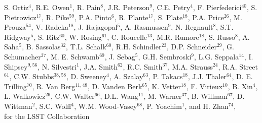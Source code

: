 {S. Ortiz$^4$,
R.E. Owen$^1$,
R. Pain$^{8}$,
J.R. Peterson$^{9}$,
C.E. Petry$^{4}$,
F. Pierfederici$^{40}$,
S. Pietrowicz$^{17}$,
R. Pike$^{59}$,
P.A. Pinto$^{6}$,
R. Plante$^{17}$,
S. Plate$^{18}$,
P.A. Price$^{26}$,
M. Prouza$^{54}$,
V. Radeka$^{18}$,
J. Rajagopal$^5$,
A. Rasmussen$^9$,
N. Regnault$^8$,
S.T. Ridgway$^5$,
S. Ritz$^{60}$,
W. Rosing$^{61}$,
C. Roucelle$^{13}$, 
M.R. Rumore$^{18}$, 
S. Russo$^8$,  
A. Saha$^{5}$,     
B. Sassolas$^{32}$, 
T.L. Schalk$^{60}$,     
R.H. Schindler$^{23}$,
D.P. Schneider$^{29}$,
G. Schumacher$^{37}$,
M. E. Schwamb$^{69}$,
J. Sebag$^5$,
G.H. Sembroski$^9$,
L.G. Seppala$^{14}$,
I. Shipsey$^{9,56}$,
N. Silvestri$^1$,
J.A. Smith$^{62}$,
R.C. Smith$^{37}$,
M.A. Strauss$^{24}$,
R.A. Street$^{61}$,
C.W. Stubbs$^{38,58}$,
D. Sweeney$^4$,
A. Szalay$^{63}$,
P. Takacs$^{18}$,
J.J. Thaler$^{64}$,
D. E. Trilling$^{70}$,
R. Van Berg$^{11,48}$,
D. Vanden Berk$^{65}$,
K. Vetter$^{18}$,
F. Virieux$^{10}$,
B. Xin$^4$,
L. Walkowicz$^{26}$,
C.W. Walter$^{66}$,
D.L. Wang$^{11}$,
M. Warner$^{37}$,
B. Willman$^{67}$,
D. Wittman$^2$,
S.C. Wolff$^4$,
W.M. Wood-Vasey$^{68}$,
P. Yoachim$^1$,
and H. Zhan$^{74}$, \\
for the LSST Collaboration
}
\affil{}

